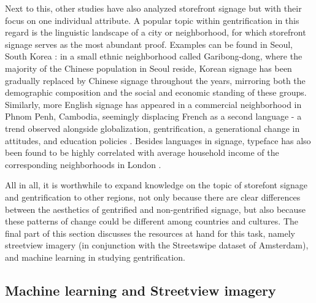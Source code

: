 Next to this, other studies have also analyzed storefront signage but with their focus on one individual attribute. A popular topic within gentrification in this regard is the linguistic landscape of a city or neighborhood, for which storefront signage serves as the most abundant proof. Examples can be found in Seoul, South Korea \cite{hong2020}: in a small ethnic neighborhood called Garibong-dong, where the majority of the Chinese population in Seoul reside, Korean signage has been gradually replaced by Chinese signage throughout the years, mirroring both the demographic composition and the social and economic standing of these groups. Similarly, more English signage has appeared in a commercial neighborhood in Phnom Penh, Cambodia, seemingly displacing French as a second language - a trend observed alongside globalization, gentrification, a generational change in attitudes, and education policies \cite{kasanga2012}. Besides languages in signage, typeface has also been found to be highly correlated with average household income of the corresponding neighborhoods in London \cite{ma2019}.

All in all, it is worthwhile to expand knowledge on the topic of storefont signage and gentrification to other regions, not only because there are clear differences between the aesthetics of gentrified and non-gentrified signage, but also because these patterns of change could be different among countries and cultures. The final part of this section discusses the resources at hand for this task, namely streetview imagery (in conjunction with the Streetswipe dataset of Amsterdam), and machine learning in studying gentrification.

\subsection{Machine learning and Streetview imagery}

